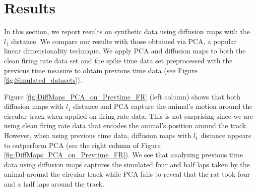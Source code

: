 
\section{Results}
In this section, we report results on  synthetic data using diffusion maps with the $l_{1}$ distance. We compare our results with those obtained via PCA, a popular linear dimensionality technique. We apply PCA and diffusion maps to both the 
clean firing rate data set and the spike time data set preprocessed  with the previous time measure to obtain previous time data (see Figure \ref{fig:Simulated_datasets}).


Figure \ref{fig:DiffMaps_PCA_on_Prevtime_FR} (left column) shows that both diffusion maps with $l_1$  distance and PCA capture the animal's motion around the circular track when applied on firing rate data. This is not surprising since we are using clean firing rate data that encodes the animal's position around the track. However, when using previous time data, diffusion maps with $l_{1}$ distance appears to outperform PCA (see the right column of Figure  \ref{fig:DiffMaps_PCA_on_Prevtime_FR}). We  see that analyzing previous time data using diffusion maps captures the simulated four and half laps taken by the animal around the circular track while PCA  fails to reveal that the rat took four and a half laps  around the track. 

